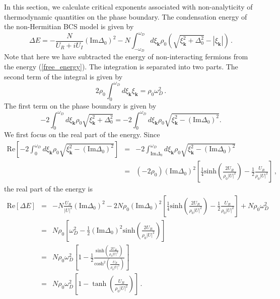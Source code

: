 \documentclass[aps,prl,twocolumn,superscriptaddress]{revtex4-1}
\begin{document}
\begin{bibunit}
In this section, we calculate critical exponents associated with non-analyticity of thermodynamic quantities on the phase boundary. The condensation energy of the non-Hermitian BCS model is given by \cite{Yamamoto2019}
\begin{equation}
	\Delta E = - \frac{N}{U_R + i U_I} \left( \text{Im} \Delta_0 \right)^2
	- N \int_{- \omega_D}^{\omega_D} d \xi_{\bm{k}} \rho_0 \left( \sqrt{\xi_{\bm{k}}^2 +
		\Delta_0^2} - | \xi_{\bm{k}} | \right)\,.\label{free_energy}
\end{equation}
Note that here we have subtracted the energy of non-interacting fermions from the energy (\ref{free_energy}). The integration is separated into two parts. The second term of the integral is given by
\begin{equation}
	2 \rho_0 \int_0^{\omega_D} d \xi_{\bm{k}} \xi_{\bm{k}} = \rho_0 \omega_D^2\,.
\end{equation}
The first term on the phase boundary is given by
\[ - 2 \int_0^{\omega_D} d \xi_{\bm{k}} \rho_0 \sqrt{\xi_{\bm{k}}^2 + \Delta_0^2} = - 2
\int_0^{\omega_D} d \xi_{\bm{k}} \rho_0 \sqrt{\xi_{\bm{k}}^2 - \left( \text{Im} \Delta_0
	\right)^2}. \]
We first focus on the real part of the energy. Since
\begin{eqnarray}
	\text{Re}\left[- 2 \int_0^{\omega_D} d \xi_{\bm{k}} \rho_0 \sqrt{\xi_{\bm{k}}^2 - \left( \text{Im}
		\Delta_0 \right)^2}\right] & = & - 2 \int_{\text{Im} \Delta_0}^{\omega_D}
	d \xi_{\bm{k}} \rho_0 \sqrt{\xi_{\bm{k}}^2 - \left( \text{Im} \Delta_0 \right)^2}
	\nonumber\\
	& = & (- 2 \rho_0) \left( \text{Im} \Delta_0 \right)^2 \left[ \frac{1}{4}
	\text{sinh} \left( \frac{2 U_R}{\rho_0 | U |^2} \right) - \frac{1}{2}
	\frac{U_R}{\rho_0 | U |^2} \right]\,,
\end{eqnarray}
the real part of the energy is
\begin{eqnarray}
	\text{Re} [\Delta E] & = & - N \frac{U_R}{| U |^2} \left( \text{Im} \Delta_0
	\right)^2 - 2 N \rho_0 \left( \text{Im} \Delta_0 \right)^2 \left[
	\frac{1}{4} \text{sinh} \left( \frac{2 U_R}{\rho_0 | U |^2} \right) -
	\frac{1}{2} \frac{U_R}{\rho_0 | U |^2} \right] + N \rho_0 \omega_D^2
	\nonumber\\
	& = & N \rho_0 \left[ \omega_D^2 - \frac{1}{2} \left( \text{Im} \Delta_0
	\right)^2 \text{sinh} \left( \frac{2 U_R}{\rho_0 | U |^2} \right) \right]
	\nonumber\\
	& = & N \rho_0 \omega_D^2 \left[ 1 - \frac{1}{2} \frac{\text{sinh} \left(
		\frac{2 U_R}{\rho_0 | U |^2} \right)}{\text{cosh}^2 \left( \frac{U_R}{\rho_0
			| U |^2} \right)} \right]\nonumber\\
	& = & N \rho_0 \omega_D^2 \left[ 1-\tanh\left(
	\frac{U_R}{\rho_0 | U |^2} \right)\right]\,.
	\label{free}
\end{eqnarray}


\end{bibunit}
\end{document}

